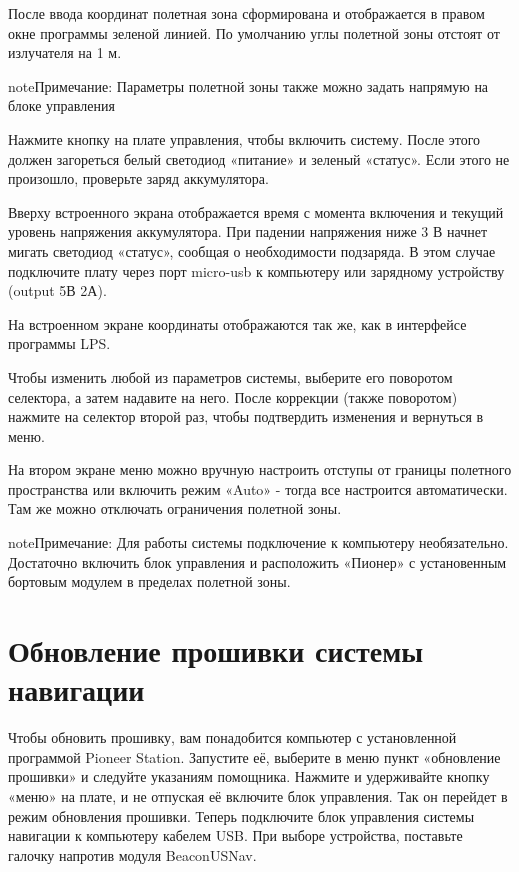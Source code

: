 \documentclass[a4paper,10pt,russian]{sphinxmanual}
\begin{document}
После ввода координат полетная зона сформирована и отображается в правом окне программы зеленой линией. По умолчанию углы полетной зоны отстоят от излучателя на 1 м.

\begin{sphinxadmonition}{note}{Примечание:}
Параметры полетной зоны также можно задать напрямую на блоке управления
\end{sphinxadmonition}

Нажмите кнопку на плате управления, чтобы включить систему. После этого должен загореться белый светодиод «питание» и зеленый «статус». Если этого не произошло, проверьте заряд аккумулятора.

Вверху встроенного экрана отображается время с момента включения и текущий уровень напряжения аккумулятора. При падении напряжения ниже 3 В начнет мигать светодиод «статус», сообщая о необходимости подзаряда. В этом случае подключите плату через порт micro-usb к компьютеру или зарядному устройству (output 5В 2А).

На встроенном экране координаты отображаются так же, как в интерфейсе программы LPS.


Чтобы изменить любой из параметров системы, выберите его поворотом селектора, а затем надавите на него. После коррекции (также поворотом) нажмите на селектор второй раз, чтобы подтвердить изменения и вернуться в меню.

На втором экране меню можно вручную настроить отступы от границы полетного пространства или включить режим «Auto» - тогда все настроится автоматически. Там же можно отключать ограничения полетной зоны.


\begin{sphinxadmonition}{note}{Примечание:}
Для работы системы подключение к компьютеру необязательно. Достаточно включить блок управления и расположить «Пионер» с установенным бортовым модулем в пределах полетной зоны.
\end{sphinxadmonition}


\section{Обновление прошивки системы навигации}
\label{\detokenize{indoor_nav:id4}}
Чтобы обновить прошивку, вам понадобится компьютер с установленной программой Pioneer Station. Запустите её, выберите в меню пункт «обновление прошивки» и следуйте указаниям помощника.
Нажмите и удерживайте кнопку «меню» на плате, и не отпуская её включите блок управления. Так он перейдет в режим обновления прошивки. Теперь подключите блок управления системы навигации к компьютеру кабелем USB. При выборе устройства, поставьте галочку напротив модуля BeaconUSNav.
\end{document}
